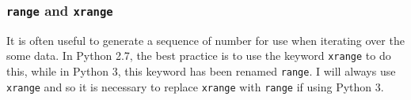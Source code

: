 \documentclass[KSmain.tex]{subfiles}
\begin{document}
\subsubsection*{\texttt{range} and \texttt{xrange}}
It is often useful to generate a sequence of number for use when iterating over the some data. In Python
2.7, the best practice is to use the keyword \texttt{xrange} to do this, while in Python 3, this keyword has been
renamed \texttt{range}. I will always use \texttt{xrange} and so it is necessary to replace \texttt{xrange} with \texttt{range} if using Python
3.
\end{document}
